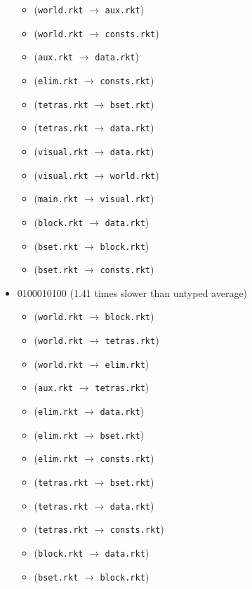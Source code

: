\documentclass{article}
\newcommand{\mono}[1]{\texttt{#1}}
\begin{document}
\begin{itemize}
\begin{itemize}
  \item (\mono{world.rkt} $\rightarrow$ \mono{aux.rkt})
  \item (\mono{world.rkt} $\rightarrow$ \mono{consts.rkt})
  \item (\mono{aux.rkt} $\rightarrow$ \mono{data.rkt})
  \item (\mono{elim.rkt} $\rightarrow$ \mono{consts.rkt})
  \item (\mono{tetras.rkt} $\rightarrow$ \mono{bset.rkt})
  \item (\mono{tetras.rkt} $\rightarrow$ \mono{data.rkt})
  \item (\mono{visual.rkt} $\rightarrow$ \mono{data.rkt})
  \item (\mono{visual.rkt} $\rightarrow$ \mono{world.rkt})
  \item (\mono{main.rkt} $\rightarrow$ \mono{visual.rkt})
  \item (\mono{block.rkt} $\rightarrow$ \mono{data.rkt})
  \item (\mono{bset.rkt} $\rightarrow$ \mono{block.rkt})
  \item (\mono{bset.rkt} $\rightarrow$ \mono{consts.rkt})
  \end{itemize}
\item 0100010100 (1.41 times slower than untyped average)
  \begin{itemize}
  \item (\mono{world.rkt} $\rightarrow$ \mono{block.rkt})
  \item (\mono{world.rkt} $\rightarrow$ \mono{tetras.rkt})
  \item (\mono{world.rkt} $\rightarrow$ \mono{elim.rkt})
  \item (\mono{aux.rkt} $\rightarrow$ \mono{tetras.rkt})
  \item (\mono{elim.rkt} $\rightarrow$ \mono{data.rkt})
  \item (\mono{elim.rkt} $\rightarrow$ \mono{bset.rkt})
  \item (\mono{elim.rkt} $\rightarrow$ \mono{consts.rkt})
  \item (\mono{tetras.rkt} $\rightarrow$ \mono{bset.rkt})
  \item (\mono{tetras.rkt} $\rightarrow$ \mono{data.rkt})
  \item (\mono{tetras.rkt} $\rightarrow$ \mono{consts.rkt})
  \item (\mono{block.rkt} $\rightarrow$ \mono{data.rkt})
  \item (\mono{bset.rkt} $\rightarrow$ \mono{block.rkt})
  \end{itemize}

\end{itemize}
\end{document}
